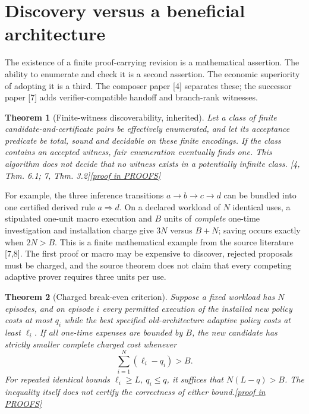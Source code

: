 \documentclass[11pt,letterpaper]{article}
\newtheorem{theorem}{Theorem}[section]
\theoremstyle{definition}
\theoremstyle{remark}
\newcommand{\prooflink}[1]{\hfill\hyperlink{proof:#1}{\footnotesize[proof in PROOFS]}}
\newcommand{\src}[1]{\textup{[#1]}}
\begin{document}
\section{Discovery versus a beneficial architecture}
The existence of a finite proof-carrying revision is a mathematical assertion. The ability to enumerate and check it is a second assertion. The economic superiority of adopting it is a third. The composer paper \src{4} separates these; the successor paper \src{7} adds verifier-compatible handoff and branch-rank witnesses.

\begin{theorem}[Finite-witness discoverability, inherited]\label{thm:enumerate}\hypertarget{claim:enumerate}{}
Let a class of finite candidate-and-certificate pairs be effectively enumerated, and let its acceptance predicate be total, sound and decidable on these finite encodings. If the class contains an accepted witness, fair enumeration eventually finds one. This algorithm does not decide that no witness exists in a potentially infinite class. \src{4, Thm. 6.1; 7, Thm. 3.2}\prooflink{enumerate}
\end{theorem}

For example, the three inference transitions $a\to b\to c\to d$ can be bundled into one certified derived rule $a\Rightarrow d$. On a declared workload of $N$ identical uses, a stipulated one-unit macro execution and $B$ units of \emph{complete} one-time investigation and installation charge give $3N$ versus $B+N$; saving occurs exactly when $2N>B$. This is a finite mathematical example from the source literature \src{7,8}. The first proof or macro may be expensive to discover, rejected proposals must be charged, and the source theorem does not claim that every competing adaptive prover requires three units per use.

\begin{theorem}[Charged break-even criterion]\label{thm:break}\hypertarget{claim:break}{}
Suppose a fixed workload has $N$ episodes, and on episode $i$ every permitted execution of the installed new policy costs at most $q_i$ while the best specified old-architecture adaptive policy costs at least $\ell_i$. If all one-time expenses are bounded by $B$, the new candidate has strictly smaller complete charged cost whenever
\[
       \sum_{i=1}^N(\ell_i-q_i)>B.
\]
For repeated identical bounds $\ell_i\geq L$, $q_i\leq q$, it suffices that $N(L-q)>B$. The inequality itself does not certify the correctness of either bound.\prooflink{break}
\end{theorem}
\end{document}
